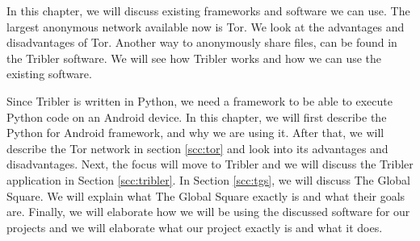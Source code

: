 In this chapter, we will discuss existing frameworks and software we can use. The largest anonymous network available now is Tor. We look at the advantages and disadvantages of Tor. Another way to anonymously share files, can be found in the Tribler software. We will see how Tribler works and how we can use the existing software.
	
Since Tribler is written in Python, we need a framework to be able to execute Python code on an Android device.
In this chapter, we will first describe the Python for Android framework, and why we are using it. After that, we will describe the Tor network in section \ref{scc:tor} and look into its advantages and disadvantages. Next, the focus will move to Tribler and we will discuss the Tribler application in Section \ref{scc:tribler}. In Section \ref{scc:tgs}, we will discuss The Global Square. We will explain what The Global Square exactly is and what their goals are. Finally, we will elaborate how we will be using the discussed software for our projects and we will elaborate what our project exactly is and what it does.